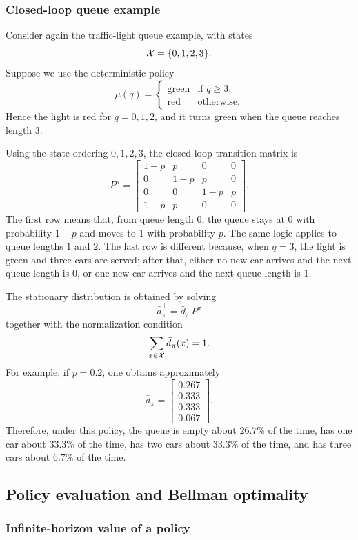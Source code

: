 \subsubsection{Closed-loop queue example}

Consider again the traffic-light queue example, with states
\[
\mathcal{X}=\{0,1,2,3\}.
\]
Suppose we use the deterministic policy
\[
\mu(q)
=
\begin{cases}
\text{green} & \text{if } q\ge 3,\\
\text{red} & \text{otherwise}.
\end{cases}
\]
Hence the light is red for \(q=0,1,2\), and it turns green when the queue reaches length \(3\).

Using the state ordering \(0,1,2,3\), the closed-loop transition matrix is
\[
P^\pi
=
\begin{bmatrix}
1-p & p   & 0   & 0\\
0   & 1-p & p   & 0\\
0   & 0   & 1-p & p\\
1-p & p   & 0   & 0
\end{bmatrix}.
\]
The first row means that, from queue length \(0\), the queue stays at \(0\) with probability
\(1-p\) and moves to \(1\) with probability \(p\). The same logic applies to queue lengths
\(1\) and \(2\). The last row is different because, when \(q=3\), the light is green and three
cars are served; after that, either no new car arrives and the next queue length is \(0\), or one
new car arrives and the next queue length is \(1\).

The stationary distribution is obtained by solving
\[
\bar d_\pi^\top
=
\bar d_\pi^\top P^\pi
\]
together with the normalization condition
\[
\sum_{x\in\mathcal{X}}\bar d_\pi(x)=1.
\]
For example, if \(p=0.2\), one obtains approximately
\[
\bar d_\pi
=
\begin{bmatrix}
0.267\\
0.333\\
0.333\\
0.067
\end{bmatrix}.
\]
Therefore, under this policy, the queue is empty about \(26.7\%\) of the time, has one car about
\(33.3\%\) of the time, has two cars about \(33.3\%\) of the time, and has three cars about
\(6.7\%\) of the time.

\subsection{Policy evaluation and Bellman optimality}
\subsubsection{Infinite-horizon value of a policy}

